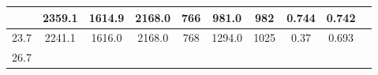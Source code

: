 \documentclass[a4paper,12pt]{article}
\begin{document}
\begin{longtable}{
     |
%    
    c|
%    
    c|
%    
    c|
%    
    c|
%    
    c|
%    
    c|
%    
    c|
%    
    c|
%    
    c|
%    
    c|
%    
    }
%        
        & 2359.1
%        

%        

%        
        & 1614.9
%        

%        

%        
        & 2168.0
%        

%        

%        
        & 766
%        

%        

%        
        & 981.0
%        

%        

%        
        & 982
%        

%        

%        
        & 0.744
%        

%        

%        
        & 0.742
%        

%        
        \\
        \hline

        

%        

%        
        23.7
%        

%        

%        
        & 2241.1
%        

%        

%        
        & 1616.0
%        

%        

%        
        & 2168.0
%        

%        

%        
        & 768
%        

%        

%        
        & 1294.0
%        

%        

%        
        & 1025
%        

%        

%        
        & 0.37
%        

%        

%        
        & 0.693
%        

%        
        \\
        \hline

        

%        

%        
        26.7
%        

%        


\end{longtable}
\end{document}
